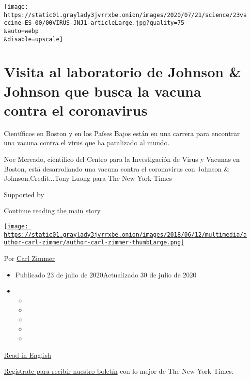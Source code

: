 \texttt{[image: https://static01.graylady3jvrrxbe.onion/images/2020/07/21/science/23vaccine-ES-00/00VIRUS-JNJ1-articleLarge.jpg?quality=75\\\&auto=webp\\\&disable=upscale]}

\hypertarget{visita-al-laboratorio-de-johnson--johnson-que-busca-la-vacuna-contra-el-coronavirus}{%
\section{Visita al laboratorio de Johnson \& Johnson que busca la vacuna
contra el
coronavirus}\label{visita-al-laboratorio-de-johnson--johnson-que-busca-la-vacuna-contra-el-coronavirus}}

Científicos en Boston y en los Países Bajos están en una carrera para
encontrar una vacuna contra el virus que ha paralizado al mundo.

Noe Mercado, científico del Centro para la Investigación de Virus y
Vacunas en Boston, está desarrollando una vacuna contra el coronavirus
con Johnson \& Johnson.Credit...Tony Luong para The New York Times

Supported by

\protect\hyperlink{after-sponsor}{Continue reading the main story}

\href{https://www.nytimes3xbfgragh.onion/by/carl-zimmer}{\texttt{[image: https://static01.graylady3jvrrxbe.onion/images/2018/06/12/multimedia/author-carl-zimmer/author-carl-zimmer-thumbLarge.png]}}

Por \href{https://www.nytimes3xbfgragh.onion/by/carl-zimmer}{Carl
Zimmer}

\begin{itemize}
\item
  Publicado 23 de julio de 2020Actualizado 30 de julio de 2020
\item
  \begin{itemize}
  \item
  \item
  \item
  \item
  \item
  \end{itemize}
\end{itemize}

\href{https://www.nytimes3xbfgragh.onion/2020/07/17/health/coronavirus-vaccine-johnson-janssen.html}{Read
in English}

\href{https://www.nytimes3xbfgragh.onion/newsletters/el-times}{Regístrate
para recibir nuestro boletín} con lo mejor de The New York Times.

